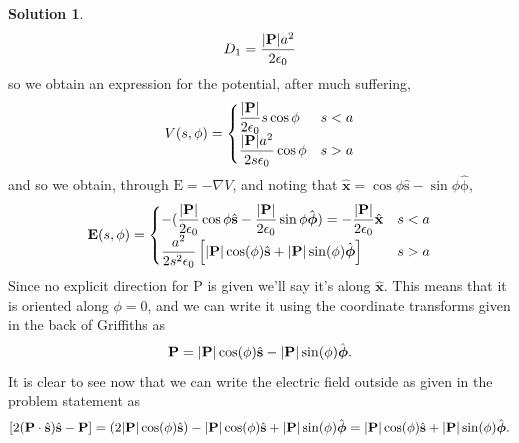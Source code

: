 \documentclass[10pt]{article}
\theoremstyle{definition}
\newtheorem{soln}{Solution}
\newcommand{\ux}{\hat{\mathbf{x}}}
\newcommand{\uv}[1]{\hat{\bv{{#1}}}}
\newcommand{\bv}[1]{\bm{\mathrm{#1}}}
\begin{document}
\begin{soln}
  $$D_1=\frac{\abs{\bv{P}}a^{2}}{2\epsilon_0}$$
  so we obtain an expression for the potential, after much suffering,
  $$V(s,\phi)=\begin{cases}
      \displaystyle \frac{\abs{\bv{P}}}{2\epsilon_0}s\cos\phi    & s<a \\
      \displaystyle \frac{\abs{\bv{P}}a^2}{2s\epsilon_0}\cos\phi & s>a
    \end{cases}$$
  and so we obtain, through $\bv{E}=-\nabla V$, and noting that $\ux=\cos\phi\uv{s}-\sin\phi\uv{\phi}$,
  $$
    \bv{E}(s,\phi)=\begin{cases}
      \displaystyle -(\frac{\abs{\bv{P}}}{2\epsilon_0}\cos\phi\uv{s}-\frac{\abs{\bv{P}}}{2\epsilon_0}\sin\phi\uv{\phi})=-\frac{\abs{\bv{P}}}{2\epsilon_0}\ux & s<a \\
      \displaystyle \frac{a^2}{2s^2\epsilon_0}\left[\abs{\bv{P}}\cos(\phi)\uv{s}+\abs{\bv{P}}\sin(\phi)\uv{\phi}\right]                                      & s>a
    \end{cases}
  $$
  Since no explicit direction for $\bv{P}$ is given we'll say it's along $\ux$. This means that it is oriented along $\phi=0$,
  and we can write it using the coordinate transforms given in the back of Griffiths as
  $$\bv{P}=\abs{\bv{P}}\cos(\phi)\uv{s}-\abs{\bv{P}}\sin(\phi)\uv{\phi}.$$
  It is clear to see now that we can write the electric field outside as given in the problem statement as
  $$\left[2(\bv{P}\cdot\uv{s})\uv{s}-\bv{P}\right]=(2\abs{\bv{P}}\cos(\phi)\uv{s})-\abs{\bv{P}}\cos(\phi)\uv{s}+\abs{\bv{P}}\sin(\phi)\uv{\phi}=\abs{\bv{P}}\cos(\phi)\uv{s}+\abs{\bv{P}}\sin(\phi)\uv{\phi}.$$

\end{soln}
\newpage
\end{document}
